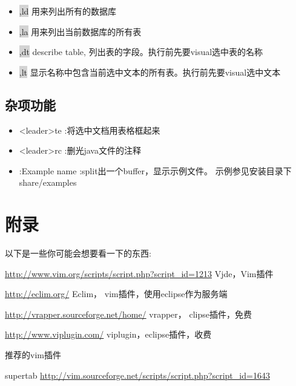 \documentclass[oneside,openany]{book}
\begin{document}
    \begin{itemize} 
    \item \colorbox{lightgray}{,ld} 用来列出所有的数据库
    \item \colorbox{lightgray}{,la} 用来列出当前数据库的所有表
    \item \colorbox{lightgray}{,dt} describe table, 列出表的字段。执行前先要visual选中表的名称
    \item \colorbox{lightgray}{,lt} 显示名称中包含当前选中文本的所有表。执行前先要visual选中文本
    \end{itemize} 

\section{杂项功能}
  \begin{itemize}
        \item <leader>te  :将选中文档用表格框起来
        \item <leader>rc  :删光java文件的注释
        \item :Example name  :split出一个buffer，显示示例文件。 示例参见安装目录下share/examples
  \end{itemize}
    

\chapter{附录}
  以下是一些你可能会想要看一下的东西:
  \newline

  \href{http://www.vim.org/scripts/script.php?script\_id=1213}{http://www.vim.org/scripts/script.php?script\_id=1213} 
  Vjde，Vim插件
  \newline

  \href{http://eclim.org/}{http://eclim.org/} Eclim， vim插件，使用eclipse作为服务端
  \newline

  \href{http://vrapper.sourceforge.net/home/}{http://vrapper.sourceforge.net/home/}
  vrapper， clipse插件，免费
  \newline

  \href{http://www.viplugin.com/}{http://www.viplugin.com/}
  viplugin，eclipse插件，收费
  \newline

  推荐的vim插件

  supertab
  \href{http://vim.sourceforge.net/scripts/script.php?script\_id=1643}
   {http://vim.sourceforge.net/scripts/script.php?script\_id=1643}
\end{document}
